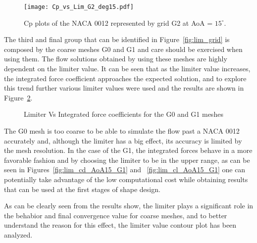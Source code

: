 \begin{figure}[]
  \centering
    \texttt{[image: Cp\_vs\_Lim\_G2\_deg15.pdf]}
    \caption{Cp plots of the NACA 0012 represented by grid G2 at AoA = $15^\circ$.}
    \label{fig:cp_vs_lim}
\end{figure}

The third and final group that can be identified in Figure~\ref{fig:lim_grid} is composed by the coarse meshes G0 and G1 and care should be exercised when using them. The flow solutions obtained by using these meshes are highly dependent on the limiter value. It can be seen that as the limiter value increases, the integrated force coefficient approaches the expected solution, and to explore this trend further various limiter values were used and the results are shown in Figure~\ref{fig:limiter_exp}.

\begin{figure}[]
  \begin{subfigmatrix}{2}
    \label{fig:lim_cd_AoA15_G0}
    \label{fig:lim_cl_AoA15_G0}
  \end{subfigmatrix}
  \begin{subfigmatrix}{2}
    \label{fig:lim_cd_AoA15_G1}
    \label{fig:lim_cl_AoA15_G1}
  \end{subfigmatrix}
  
  \caption{Limiter Vs Integrated force coefficients for the G0 and G1 meshes}
  \label{fig:limiter_exp}
\end{figure}

The G0 mesh is too coarse to be able to simulate the flow past a NACA 0012 accurately and, although the limiter has a big effect, its accuracy is limited by the mesh resolution. In the case of the G1, the integrated forces behave in a more favorable fashion and by choosing the limiter to be in the upper range, as can be seen in Figures~\ref{fig:lim_cd_AoA15_G1} and ~\ref{fig:lim_cl_AoA15_G1} one can potentially take advantage of the low computational cost while obtaining results that can be used at the first stages of shape design.

As can be clearly seen from the results show, the limiter plays a significant role in the behabior and final convergence value for coarse meshes, and to better understand the reason for this effect, the limiter value contour plot has been analyzed. 

